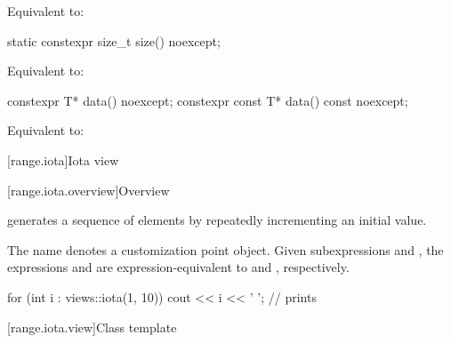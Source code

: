 \begin{itemdescr}
\pnum
\effects
Equivalent to: 
\end{itemdescr}

%
\begin{itemdecl}
static constexpr size_t size() noexcept;
\end{itemdecl}

\begin{itemdescr}
\pnum
\effects
Equivalent to: 
\end{itemdescr}

%
\begin{itemdecl}
constexpr T* data() noexcept;
constexpr const T* data() const noexcept;
\end{itemdecl}

\begin{itemdescr}
\pnum
\effects
Equivalent to: 
\end{itemdescr}

[range.iota]{Iota view}

[range.iota.overview]{Overview}

\pnum
{} generates a
sequence of elements by repeatedly incrementing an initial value.

\pnum
{}%
The name  denotes a
customization point object.
Given subexpressions  and , the expressions
 and 
are expression-equivalent to
 and ,
respectively.

\pnum
\begin{example}
\begin{codeblock}
for (int i : views::iota(1, 10))
  cout << i << ' '; // prints 
\end{codeblock}
\end{example}

[range.iota.view]{Class template }

